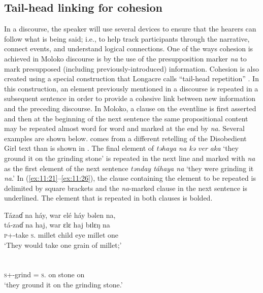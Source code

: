 \subsection{Tail-head linking for cohesion}\label{sec:11.1.3}
\hypertarget{RefHeading1213221525720847}{}
In a discourse, the speaker will use several devices to ensure that the hearers can follow what is being said; i.e., to help track participants through the narrative, connect events, and understand logical connections. One of the ways cohesion is achieved in Moloko discourse is by the use of the presupposition marker \textit{na} to mark presupposed (including previously-introduced) information. Cohesion is also created using a special construction that Longacre calls “tail-head repetition” \citep[204]{Longacre1976}. In this construction, an element previously mentioned in a discourse is repeated in a subsequent sentence in order to provide a cohesive link between new information and the preceding discourse. In Moloko, a clause on the eventline is first asserted and then at the beginning of the next sentence the same propositional content may be repeated almost word for word and marked at the end by \textit{na}. Several examples are shown below.  comes from a different retelling of the Disobedient Girl text than is shown in . The final element of \textit{təhaya na kə ver aka} ‘they ground it on the grinding stone’ is repeated in the next line and marked with \textit{na} as the first element of the next sentence \textit{tənday táhaya na} ‘they were grinding it \textit{na}.’ In (\ref{ex:11:21}--\ref{ex:11:26}), the clause containing the element to be repeated is delimited by square brackets and the \textit{na}{}-marked clause in the next sentence is underlined. The element that is repeated in both clauses is bolded. 

\ea \label{ex:11:21}
Tázaɗ  na  háy,  war  elé  háy  bəlen  na,\\  
\gll  tá-zaɗ  na  haj,  war ɛlɛ   haj  bɪlɛŋ  na \\       
      \textsc{p}+{\IFV}-take  \textsc{s}.{\DO}  millet  child  eye   millet  one {\PSP} \\         
\glt ‘They would take one grain of millet;’\\

\\  
\gll [\textbf{t\'ə-h}  \textbf{=aja}  na kə  vɛr  aka] \\
     \textsc{s}+{\IFV}-grind ={\PLU}   \textsc{s}.{\DO} on stone  on\\
\glt ‘they ground it on the grinding stone.’\\

